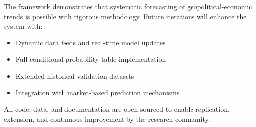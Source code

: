 \documentclass{article}
\begin{document}
The framework demonstrates that systematic forecasting of geopolitical-economic trends is possible with rigorous methodology. Future iterations will enhance the system with:
\begin{itemize}
\item Dynamic data feeds and real-time model updates
\item Full conditional probability table implementation
\item Extended historical validation datasets
\item Integration with market-based prediction mechanisms
\end{itemize}

All code, data, and documentation are open-sourced to enable replication, extension, and continuous improvement by the research community.
\end{document}
